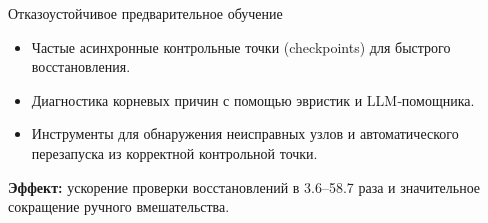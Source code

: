 \begin{frame}{Отказоустойчивое предварительное обучение}
	\begin{itemize}
		\item Частые асинхронные контрольные точки (checkpoints) для быстрого восстановления.
		\item Диагностика корневых причин с помощью эвристик и LLM‑помощника.
		\item Инструменты для обнаружения неисправных узлов и автоматического перезапуска из корректной контрольной точки.
	\end{itemize}
	\textbf{Эффект:} ускорение проверки восстановлений в 3.6–58.7 раза и значительное сокращение ручного вмешательства.
\end{frame}